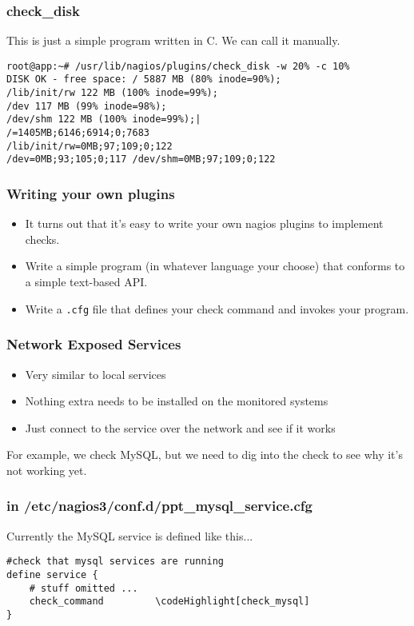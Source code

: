 \documentclass[10pt]{beamer}
\newcommand\codeHighlight[1]{\textcolor[rgb]{1,0,0}{\textbf{#1}}}
\begin{document}
\begin{frame}[fragile]
  \frametitle{check\_disk}

  This is just a simple program written in C.  We can call it manually.
\begin{Verbatim}[commandchars=\\\[\]]
root@app:~# /usr/lib/nagios/plugins/check_disk -w 20% -c 10%
DISK OK - free space: / 5887 MB (80% inode=90%);
/lib/init/rw 122 MB (100% inode=99%);
/dev 117 MB (99% inode=98%);
/dev/shm 122 MB (100% inode=99%);|
/=1405MB;6146;6914;0;7683
/lib/init/rw=0MB;97;109;0;122
/dev=0MB;93;105;0;117 /dev/shm=0MB;97;109;0;122
\end{Verbatim}
\end{frame}


\begin{frame}
  \frametitle{Writing your own plugins}


\begin{itemize}
  \item It turns out that it's easy to write your own nagios plugins to 
	  implement checks.
  \item Write a simple program (in whatever language your choose) that 
	  conforms to a simple text-based API.
  \item Write a \texttt{.cfg} file that defines your check command and invokes
		  your program.
\end{itemize}


\end{frame}
\begin{frame}
  \frametitle{Network Exposed Services}


\begin{itemize}
  \item Very similar to local services
  \item Nothing extra needs to be installed on the monitored systems
  \item Just connect to the service over the network and see if it works
\end{itemize}

For example, we check MySQL, but we need to dig into the check to see why
it's not working yet.

\end{frame}

\begin{frame}[fragile]
  \frametitle{in /etc/nagios3/conf.d/ppt\_mysql\_service.cfg}

Currently the MySQL service is defined like this...
\begin{Verbatim}[commandchars=\\\[\]]
#check that mysql services are running
define service {
    # stuff omitted ...
    check_command         \codeHighlight[check_mysql]
}

\end{Verbatim}
\end{frame}
\end{document}
